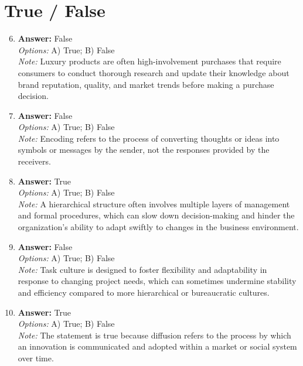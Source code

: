 \documentclass[12pt]{article}
\begin{document}
\section*{True / False}
\begin{enumerate}[label=\arabic*.]
\setcounter{enumi}{5}
\item \textbf{Answer:} False
\\ \textit{Options:} A) True; B) False
\\ \textit{Note:} Luxury products are often high-involvement purchases that require consumers to conduct thorough research and update their knowledge about brand reputation, quality, and market trends before making a purchase decision.
\item \textbf{Answer:} False
\\ \textit{Options:} A) True; B) False
\\ \textit{Note:} Encoding refers to the process of converting thoughts or ideas into symbols or messages by the sender, not the responses provided by the receivers.
\item \textbf{Answer:} True
\\ \textit{Options:} A) True; B) False
\\ \textit{Note:} A hierarchical structure often involves multiple layers of management and formal procedures, which can slow down decision-making and hinder the organization's ability to adapt swiftly to changes in the business environment.
\item \textbf{Answer:} False
\\ \textit{Options:} A) True; B) False
\\ \textit{Note:} Task culture is designed to foster flexibility and adaptability in response to changing project needs, which can sometimes undermine stability and efficiency compared to more hierarchical or bureaucratic cultures.
\item \textbf{Answer:} True
\\ \textit{Options:} A) True; B) False
\\ \textit{Note:} The statement is true because diffusion refers to the process by which an innovation is communicated and adopted within a market or social system over time.
\end{enumerate}
\end{document}
